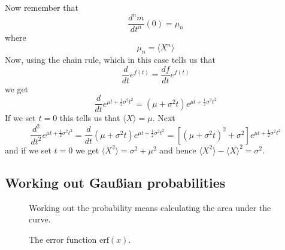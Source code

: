 \documentclass[11pt,a4paper]{scrartcl}
\begin{document}
Now remember that 
\begin{equation}
\frac{d^nm}{dt^n}(0)=\mu_n
\end{equation}
where 
\begin{equation}
\mu_n=\langle X^n\rangle
\end{equation}
Now, using the chain rule, which in this case tells us that
\begin{equation}
\frac{d}{dt}e^{f(t)}=\frac{df}{dt}e^{f(t)}
\end{equation}
we get
\begin{equation}
\frac{d}{dt}e^{\mu t + \frac{1}{2}\sigma^2 t^2}=(\mu+\sigma^2 t)e^{\mu t + \frac{1}{2}\sigma^2 t^2}
\end{equation}
If we set $t=0$ this tells us that $\langle X\rangle =\mu$. Next
 \begin{equation}
\frac{d^2}{dt^2}e^{\mu t + \frac{1}{2}\sigma^2 t^2}=\frac{d}{dt}(\mu+\sigma^2 t)e^{\mu t + \frac{1}{2}\sigma^2 t^2}=[(\mu+\sigma^2 t)^2+\sigma^2]e^{\mu t + \frac{1}{2}\sigma^2 t^2}
\end{equation}
and if we set $t=0$ we get $\langle X^2\rangle =\sigma^2+\mu^2$ and
hence $\langle X^2\rangle-\langle X\rangle^2=\sigma^2$.

\subsection*{Working out Gau\ss{}ian probabilities}


\begin{figure}[tb]
\begin{center}

\end{center}
\caption{Working out the probability means calculating the area under the curve.\label{fig_prob}}
\end{figure}


\begin{figure}[tb]
\begin{center}

\end{center}
\caption{The error function $\mbox{erf}(x)$.\label{fig_erf}}
\end{figure}
\end{document}
